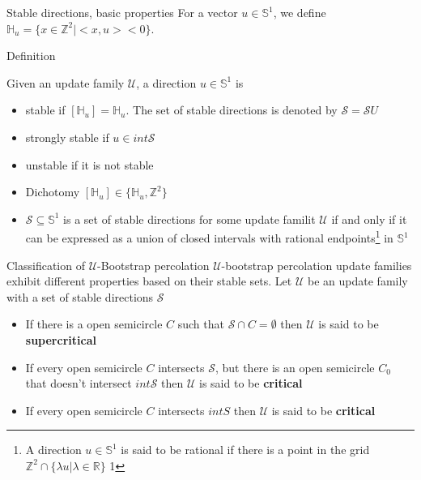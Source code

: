 \begin{frame}{Stable directions, basic properties}
For a vector $u\in\mathbb{S}^1$, we define $
\mathbb{H}_u=\{x\in\mathbb{Z}^2|<x,u><0\}$.

\begin{block}{Definition}



Given an update family $\mathscr{U}$, a direction $u\in\mathbb{S}^1$ is
\begin{itemize}

    \item stable if $[\mathbb{H}_u]=\mathbb{H}_u$. The set of stable directions is denoted by $\mathscr{S}=\mathscr{S}{U}$
    \item strongly stable if $u\in int\mathscr{S}$
    \item unstable if it is not stable


\end{itemize}
\end{block}


\begin{itemize}
    \item Dichotomy $[\mathbb{H}_u]\in\{\mathbb{H}_u,\mathbb{Z}^2\}$
    \item $\mathscr{S}\subseteq\mathbb{S}^1$ is a set of stable directions for some update familit $\mathscr{U}$ if and only if it can be expressed as a union of closed intervals with rational endpoints\footnote{A direction $u\in\mathbb{S}^1$ is said to be rational if there is a point in the grid $\mathbb{Z}^2\cap\{\lambda u|\lambda\in\mathbb{R}\}$
    1}
    in $\mathbb{S}^1$
\end{itemize}



\end{frame}

\begin{frame}{Classification of $\mathscr{U}$-Bootstrap percolation}
$\mathscr{U}$-bootstrap percolation update families exhibit different properties based on their stable sets. Let $\mathscr{U}$ be an update family with a set of stable directions $\mathscr{S}$
\begin{block}

\begin{itemize}
    \item If there is a open semicircle $C$ such that $\mathscr{S}\cap C=\emptyset$ then $\mathscr{U}$ is said to be \textbf{supercritical}
    \item If every open semicircle $C$ intersects $\mathscr{S}$, but there is an open semicircle $C_0$ that doesn't intersect $int\mathscr{S}$ then $\mathscr{U}$ is said to be \textbf{critical}
    \item If every open semicircle $C$ intersects $int S$ then $\mathscr{U}$ is said to be \textbf{critical}
\end{itemize}

\end{block}

\end{frame}

